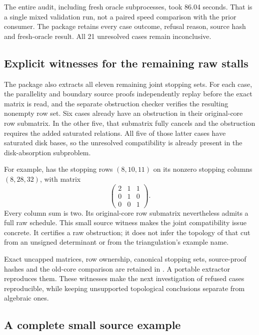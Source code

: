 The entire audit, including fresh oracle subprocesses, took 86.04 seconds.
That is a single mixed validation run, not a paired speed comparison
with the prior consumer. The package retains every case outcome,
refusal reason, source hash and fresh-oracle result. All 21 unresolved
cases remain inconclusive.

\subsection{Explicit witnesses for the remaining raw stalls}

The package also extracts all eleven remaining joint stopping sets.
For each case, the parallelity and boundary source proofs independently
replay before the exact matrix is read, and the separate obstruction
checker verifies the resulting nonempty row set. Six cases already have
an obstruction in their original-core row submatrix. In the other five,
that submatrix fully cancels and the obstruction requires the added
saturated relations. All five of those latter cases have saturated disk
bases, so the unresolved compatibility is already present in the
disk-absorption subproblem.

For example,  has the stopping rows
$(8,10,11)$ on its nonzero stopping columns $(8,28,32)$, with matrix
\[
 \begin{pmatrix}2&1&1\\0&1&0\\0&0&1\end{pmatrix}.
\]
Every column sum is two. Its original-core row submatrix nevertheless
admits a full raw schedule. This small source witness makes the joint
compatibility issue concrete. It certifies a raw obstruction; it does
not infer the topology of that cut from an unsigned determinant or
from the triangulation's example name.

Exact uncapped matrices, row ownership, canonical stopping sets,
source-proof hashes and the old-core comparison are retained in
. A portable
extractor reproduces them. These witnesses make the next investigation
of refused cases reproducible, while keeping unsupported topological
conclusions separate from algebraic ones.

\subsection{A complete small source example}

